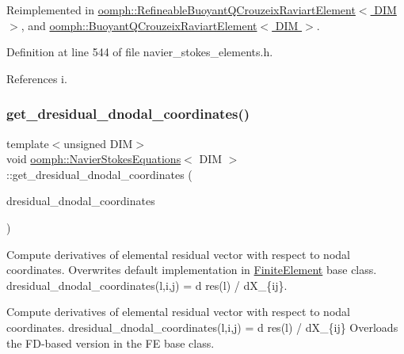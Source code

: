 Reimplemented in \hyperlink{classoomph_1_1RefineableBuoyantQCrouzeixRaviartElement_a69fb9113989d692dd55eb1983cdbc93b}{oomph\+::\+Refineable\+Buoyant\+Q\+Crouzeix\+Raviart\+Element$<$ D\+I\+M $>$}, and \hyperlink{classoomph_1_1BuoyantQCrouzeixRaviartElement_aeeef7868070fd692b33e5afa811af1da}{oomph\+::\+Buoyant\+Q\+Crouzeix\+Raviart\+Element$<$ D\+I\+M $>$}.



Definition at line 544 of file navier\+\_\+stokes\+\_\+elements.\+h.



References i.

\mbox{\label{classoomph_1_1NavierStokesEquations_a5b4bfb29d32e40fe536ee2a5934daddb}} 
\subsubsection{\texorpdfstring{get\+\_\+dresidual\+\_\+dnodal\+\_\+coordinates()}{get\_dresidual\_dnodal\_coordinates()}}
{\footnotesize\ttfamily template$<$unsigned D\+IM$>$ \\
void \hyperlink{classoomph_1_1NavierStokesEquations}{oomph\+::\+Navier\+Stokes\+Equations}$<$ D\+IM $>$\+::get\+\_\+dresidual\+\_\+dnodal\+\_\+coordinates (\begin{DoxyParamCaption}\item[{\hyperlink{classoomph_1_1RankThreeTensor}{Rank\+Three\+Tensor}$<$ double $>$ \&}]{dresidual\+\_\+dnodal\+\_\+coordinates }\end{DoxyParamCaption})\hspace{0.3cm}{\ttfamily [virtual]}}



Compute derivatives of elemental residual vector with respect to nodal coordinates. Overwrites default implementation in \hyperlink{classoomph_1_1FiniteElement}{Finite\+Element} base class. dresidual\+\_\+dnodal\+\_\+coordinates(l,i,j) = d res(l) / d\+X\+\_\+\{ij\}. 

Compute derivatives of elemental residual vector with respect to nodal coordinates. dresidual\+\_\+dnodal\+\_\+coordinates(l,i,j) = d res(l) / d\+X\+\_\+\{ij\} Overloads the F\+D-\/based version in the FE base class. 

